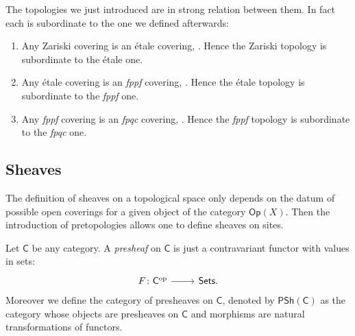 \noindent
The topologies we just introduced are in strong relation between them.
In fact each is subordinate to the one we defined afterwards:
\begin{rem}
	\leavevmode\vspace{-0.2\baselineskip}
\begin{enumerate}
\item Any Zariski covering is an étale covering, 
	\cite[\href{https://stacks.math.columbia.edu/tag/0216}{Lemma 0216}]{SP}.
	Hence the Zariski topology is subordinate to the étale one.


\item Any étale covering is an \emph{fppf} covering, 
	\cite[\href{https://stacks.math.columbia.edu/tag/021N}{Lemma 021N}]{SP}.
	Hence the étale topology is subordinate to the \emph{fppf} one.


\item Any \emph{fppf} covering is an \emph{fpqc} covering, 
	\cite[\href{https://stacks.math.columbia.edu/tag/022C}{Lemma 022C}]{SP}.
	Hence the \emph{fppf} topology is subordinate to the \emph{fpqc} one.
\end{enumerate}
\end{rem}



\subsection{Sheaves}
The definition of sheaves on a topological space only
depends on the datum of possible open coverings for a given object of
the category $\mathsf{Op}(X)$.
Then the introduction of pretopologies allows one to define sheaves on sites.


\begin{defn}[Presheaves]
	Let $\mathsf{C}$ be any category.
	A \emph{presheaf} on $\mathsf{C}$ is just a contravariant functor with
	values in sets:
	\begin{equation*}
	\begin{tikzcd}[row sep = 0ex
		,/tikz/column 1/.append style={anchor=base east}
		,/tikz/column 2/.append style={anchor=base west}]
		F\colon \mathsf{C}^{\mathrm{op}} \arrow[r, "", rightarrow] &
		\mathsf{Sets}
	.\end{tikzcd}
	\end{equation*} 
	Moreover we define the category of presheaves on $\mathsf{C}$,
	denoted by $\mathsf{PSh}(\mathsf{C})$ as the category
	whose objects are presheaves on $\mathsf{C}$ and
	morphisms are natural transformations of functors.
\end{defn}


